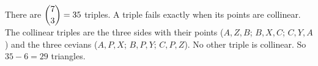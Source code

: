 There are $\dbinom73=35$ triples. A triple fails exactly when its points are collinear. The collinear triples are the three sides with their points ($A,Z,B$; $B,X,C$; $C,Y,A$) and the three cevians ($A,P,X$; $B,P,Y$; $C,P,Z$). No other triple is collinear. So $35-6=\boxed{29}$ triangles.
